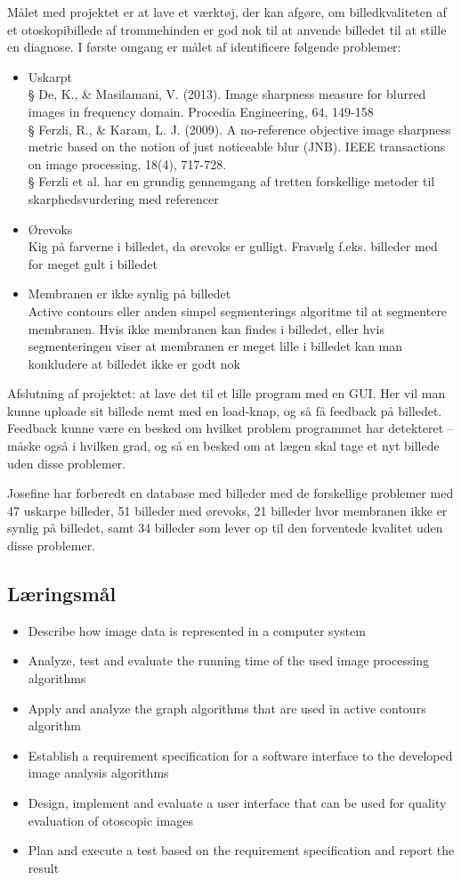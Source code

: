 Målet med projektet er at lave et værktøj, der kan afgøre, om billedkvaliteten af et otoskopibillede af trommehinden er god nok til at anvende billedet til at stille en diagnose. I første omgang er målet af identificere følgende problemer:
\begin{itemize}
    \item Uskarpt\\
§ De, K., \& Masilamani, V. (2013). Image sharpness measure for blurred images in frequency domain. Procedia Engineering, 64, 149-158\\
§ Ferzli, R., \& Karam, L. J. (2009). A no-reference objective image sharpness metric based on the notion of just noticeable blur (JNB). IEEE transactions on image processing, 18(4), 717-728.\\
§ Ferzli et al. har en grundig gennemgang af tretten forskellige metoder til skarphedsvurdering med referencer
\item Ørevoks\\
Kig på farverne i billedet, da ørevoks er gulligt. Fravælg f.eks. billeder med for meget gult i billedet
\item Membranen er ikke synlig på billedet\\
Active contours eller anden simpel segmenterings algoritme til at segmentere membranen. Hvis ikke membranen kan findes i billedet, eller hvis segmenteringen viser at membranen er meget lille i billedet kan man konkludere at billedet ikke er godt nok
\end{itemize}
Afslutning af projektet: at lave det til et lille program med en GUI. Her vil man kunne uploade sit billede nemt med en load-knap, og så få feedback på billedet. Feedback kunne være en besked om hvilket problem programmet har detekteret – måske også i hvilken grad, og så en besked om at lægen skal tage et nyt billede uden disse problemer.

Josefine har forberedt en database med billeder med de forskellige problemer med 47 uskarpe billeder, 51 billeder med ørevoks, 21 billeder hvor membranen ikke er synlig på billedet, samt 34 billeder som lever op til den forventede kvalitet uden disse problemer.

\subsection*{Læringsmål}
\begin{itemize}
    \item Describe how image data is represented in a computer system
    \item Analyze, test and evaluate the running time of the used image processing algorithms
    \item Apply and analyze the graph algorithms that are used in active contours algorithm
    \item Establish a requirement specification for a software interface to the developed image analysis algorithms
    \item Design, implement and evaluate a user interface that can be used for quality evaluation of otoscopic images
    \item Plan and execute a test based on the requirement specification and report the result
\end{itemize}

